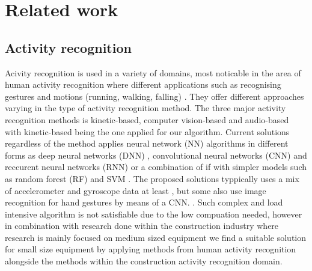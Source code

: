 \section{Related work}
\subsection{Activity recognition}
Acivity recognition is used in a variety of domains, most noticable in the area of human activity recognition where different applications such as recognising gestures and motions (running, walking, falling) . 
They offer different approaches varying in the type of activity recognition method. 
The three major activity recognition methods is kinetic-based, computer vision-based and audio-based  with kinetic-based being the one applied for our algorithm. 
Current solutions regardless of the method applies neural network (NN)  algorithms in different forms as deep neural networks (DNN) , convolutional neural networks (CNN)  and reccurent neural networks (RNN)  or a combination of if with simpler models such as random forest (RF)  and SVM . 
The proposed solutions typpically uses a mix of accelerometer and gyroscope data at least , but some also use image recognition for hand gestures by means of a CNN. . 
Such complex and load intensive algorithm  is not satisfiable due to the low compuation needed, however in combination with research done within the construction  industry  where research is mainly focused on medium sized equipment  we find  a suitable solution  for small size equipment by applying methods from human activity recognition alongside the methods within the construction activity recognition domain.

